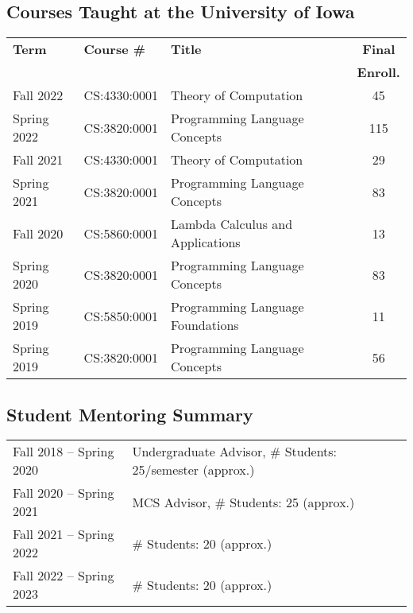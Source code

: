 \documentclass[10pt]{article}
\renewcommand{\iowa}[1]{#1}
\renewcommand{\iowa}[1]{}
\begin{document}
\iowa{
\section*{\teaching}
}
\begin{IOWA ONLY}

\subsection*{Courses Taught at the University of Iowa}
\smallskip

\begin{tabular}{| l | l | p{15em} | c |}
 \hline
 {\bf Term} & {\bf Course \#} & {\bf Title}    & {\bf Final} \\ 
            &                 &             & {\bf Enroll.} \\ 
 \hline
 \hline
 Fall 2022
 & CS:4330:0001 & Theory of Computation
 & 45
 \\
 \hline
 Spring 2022
 & CS:3820:0001 & Programming Language Concepts
 & 115
 \\
 \hline
 Fall 2021
 & CS:4330:0001 & Theory of Computation
 & 29
 \\
 \hline
 Spring 2021
 & CS:3820:0001 & Programming Language Concepts
 & 83
 \\
 \hline
 Fall 2020
 & CS:5860:0001 & Lambda Calculus and Applications
 & 13
 \\
 \hline
 Spring 2020
 & CS:3820:0001 & Programming Language Concepts
 & 83
 \\
 \hline
 Spring 2019
 & CS:5850:0001  & Programming Language Foundations
 & 11
 \\
 \hline
 Spring 2019
 & CS:3820:0001 & Programming Language Concepts
 & 56
 \\
 \hline
\end{tabular}
\smallskip


\subsection*{Student Mentoring Summary}
\smallskip

\begin{tabular}{l@{\quad\ }p{35em}} 
 Fall 2018 -- Spring 2020
 & Undergraduate Advisor, \# Students: 25/semester (approx.)
 \\[.5ex]
 Fall 2020 -- Spring 2021
 & MCS Advisor, \# Students: 25 (approx.)
 \\[.5ex]
 Fall 2021 -- Spring 2022
 & \# Students: 20 (approx.)
 \\[.5ex]
 Fall 2022 -- Spring 2023
 & \# Students: 20 (approx.)
 \\[.5ex]
\end{tabular}


\end{IOWA ONLY}
\end{document}
